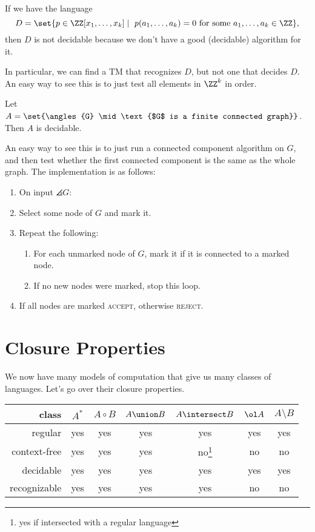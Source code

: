 \documentclass{standalone}
\begin{document}
\begin{example}
  If we have the language
  \[
    D = \set{
      p \in \ZZ[x_1, \dotsc, x_k] \mid
      \text{
        \(p(a_1, \dotsc, a_k) = 0\) for some \(a_1, \dotsc, a_k \in \ZZ\)}
      },
  \]
  then \(D\) is not decidable because we don't have
  a good (decidable) algorithm for it.
\end{example}
In particular, we can find a \textsf{TM} that recognizes \(D\),
but not one that decides \(D\).
An easy way to see this is to just test all elements in \(\ZZ^k\) in order.

\begin{example}
  Let \(A = \set{\angles{G} \mid \text{$G$ is a finite connected graph}}\).
  Then \(A\) is decidable.
\end{example}
An easy way to see this is to just run
a connected component algorithm on \(G\),
and then test whether the first connected component
is the same as the whole graph.
The implementation is as follows:
\begin{enumerate}[start=0]
  \item On input \(\angles{G}\):
  \item Select some node of \(G\) and mark it.
  \item Repeat the following:
  \begin{enumerate}[nosep]
    \item For each unmarked node of \(G\),
          mark it if it is connected to a marked node.
    \item If no new nodes were marked, stop this loop.
  \end{enumerate}
  \item If all nodes are marked \textsc{accept}, otherwise \textsc{reject}.
\end{enumerate}

\section{Closure Properties}
We now have many models of computation that give us many classes of languages.
Let's go over their closure properties.

\begin{center}
  \newcommand{\AcapBCTF}{yes if intersected with a regular language}
  \begin{tabular}{r c c c c c c}
    \toprule
    class        & \(A^*\) & \(A \circ B\) & \(A \union B\) & \(A \intersect B\)     & \(\ol A\) & \(A \setminus B\) \\ \midrule
    regular      & yes     & yes           & yes            & yes                    & yes       & yes               \\
    context-free & yes     & yes           & yes            & no\footnote{\AcapBCTF} & no        & no                \\
    decidable    & yes     & yes           & yes            & yes                    & yes       & yes               \\
    recognizable & yes     & yes           & yes            & yes                    & no        & no                \\
    \bottomrule
  \end{tabular}
\end{center}
\end{document}

